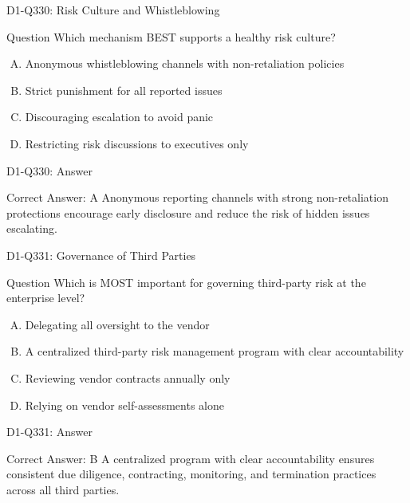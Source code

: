\documentclass{beamer}
\begin{document}
\begin{frame}{D1-Q330: Risk Culture and Whistleblowing}
	\begin{block}{Question}
		Which mechanism BEST supports a healthy risk culture?
	\end{block}
	\begin{enumerate}[(A)]
		\item Anonymous whistleblowing channels with non-retaliation policies
		\item Strict punishment for all reported issues
		\item Discouraging escalation to avoid panic
		\item Restricting risk discussions to executives only
	\end{enumerate}
\end{frame}
\begin{frame}{D1-Q330: Answer}
	\begin{block}{Correct Answer: A}
		Anonymous reporting channels with strong non-retaliation protections encourage early disclosure and reduce the risk of hidden issues escalating.
	\end{block}
\end{frame}

\begin{frame}{D1-Q331: Governance of Third Parties}
	\begin{block}{Question}
		Which is MOST important for governing third-party risk at the enterprise level?
	\end{block}
	\begin{enumerate}[(A)]
		\item Delegating all oversight to the vendor
		\item A centralized third-party risk management program with clear accountability
		\item Reviewing vendor contracts annually only
		\item Relying on vendor self-assessments alone
	\end{enumerate}
\end{frame}
\begin{frame}{D1-Q331: Answer}
	\begin{block}{Correct Answer: B}
		A centralized program with clear accountability ensures consistent due diligence, contracting, monitoring, and termination practices across all third parties.
	\end{block}
\end{frame}
\end{document}
